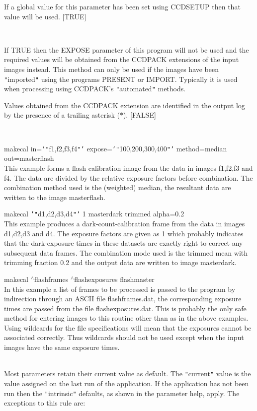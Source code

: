 \documentclass[twoside,11pt]{article}
\newcommand{\htmlref}[2]{#1}
\renewcommand{\_}{\texttt{\symbol{95}}}
\newcommand{\qt}[1]{{\tt "}#1{\tt "}}
\newcommand{\qs}[1]{{\tt '}#1{\tt '}}
\newcommand{\xroutine}[1]{\htmlref{{\sc #1}}{#1}}
\newcommand{\sstexamples}[1]{
   \item[Examples:] \mbox{} \\
   \vspace{-3.5ex}
   \begin{description}
      #1
   \end{description}
}
\newcommand{\sstsubsection}[1]{ \item[{#1}] \mbox{} \\}
\newcommand{\sstexamplesubsection}[2]{\sloppy \item{\ssttt #1} \mbox{} \\ #2 }
\newcommand{\sstdiytopic}[2]{\item[#1:] \mbox{} \\[1.3ex] #2}
\newcommand{\sstitemlist}[1]{
  \mbox{} \\
  \vspace{-3.5ex}
  \begin{itemize}
     #1
  \end{itemize}
}
\newcommand{\sstexamples}[1]{
      \item[Examples:] \\
      \begin{description}
         #1
      \end{description}
      \\
   }
\newcommand{\sstsubsection}[1]{\item[{#1}]}
\newcommand{\sstexamplesubsection}[2]{\item[{\ssttt #1}] #2}
\newcommand{\sstdiytopic}[2]{\item[{#1}] #2 }
\newcommand{\sstitemlist}[1]{
      \begin{itemize}
         #1
      \end{itemize}
      \\
   }
\begin{document}
{{{         If a global value for this parameter has been set using 
         \xroutine{CCDSETUP} then that value will be used.
         [TRUE]
      }
      \sstsubsection{
         USEEXT = \_LOGICAL (Read)
      } {
         If TRUE then the EXPOSE parameter of this program will not
         be used and the required values will be obtained from the
         CCDPACK extensions of the input images instead. This method can
         only be used if the images have been \qt{imported} using the
         programs \xroutine{PRESENT} or \xroutine{IMPORT}. Typically it is used when
         processing using CCDPACK's \qt{automated} methods.

         Values obtained from the CCDPACK extension are identified in
         the output log by the presence of a trailing asterisk ($*$).
         [FALSE]
      }
   }
   \sstexamples{
      \sstexamplesubsection{
         makecal in=\qs{\qt{f1,f2,f3,f4}} expose=\qs{\qt{100,200,300,400}}
                 method=median out=master\_flash
      } {
         This example forms a flash calibration image from the data in
         images f1,f2,f3 and f4. The data are divided by the relative
         exposure factors before combination. The combination method
         used is the (weighted) median, the resultant data are written
         to the image master\_flash.
      }
      \sstexamplesubsection{
         makecal \qs{\qt{d1,d2,d3,d4}} 1 master\_dark trimmed alpha=0.2
      } {
         This example produces a dark-count-calibration frame from the
         data in images d1,d2,d3 and d4. The exposure factors are given
         as 1 which probably indicates that the dark-exposure times in
         these datasets are exactly right to correct any subsequent
         data frames. The combination mode used is the trimmed mean with
         trimming fraction 0.2 and the output data are written to image
         master\_dark.
      }
      \sstexamplesubsection{
         makecal $^\wedge$flash\_frames $^\wedge$flash\_exposures flash\_master
      } {
         In this example a list of frames to be processed is passed to
         the program by indirection through an ASCII file
         flash\_frames.dat, the corresponding exposure times are passed
         from the file flash\_exposures.dat. This is probably the only
         safe method for entering images to this routine other than as in
         the above examples. Using wildcards for the file
         specifications will mean that the exposures cannot be
         associated correctly. Thus wildcards should not be used except
         when the input images have the same exposure times.
      }
   }
   \sstdiytopic{
      Behaviour of parameters
   } {
      Most parameters retain their current value as default. The
      \qt{current} value is the value assigned on the last run of the
      application. If the application has not been run then the
      \qt{intrinsic} defaults, as shown in the parameter help, apply.
      The exceptions to this rule are:
      \sstitemlist{

}}}
\end{document}
